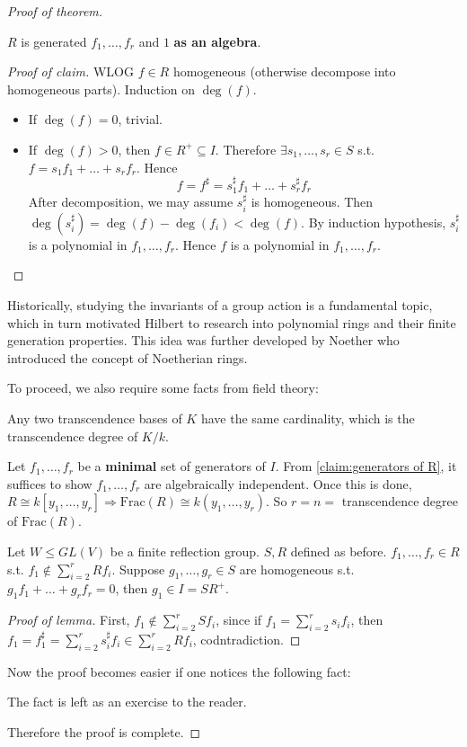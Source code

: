 \documentclass[12pt]{extarticle}
\begin{document}
\begin{proof}[Proof of theorem]
        \begin{claim}\label{claim:generators of R}
                $R$ is generated $f_1, \dots, f_r$ and $1$ \textbf{as an algebra}.
        \end{claim}
        \begin{proof}[Proof of claim]
            WLOG $f\in R$ homogeneous (otherwise decompose into homogeneous parts). Induction on $\deg(f)$.
            \begin{itemize}
                \item If $\deg(f) = 0$, trivial.
                \item If $\deg(f) >0$, then $f\in R^+\subseteq I$. Therefore $\exists s_1, \dots, s_r\in S$ s.t. $f = s_1 f_1 + \dots + s_r f_r$. Hence
                    $$f = f^\sharp = s_1^\sharp f_1 + \dots + s_r^\sharp f_r$$
                    After decomposition, we may assume $s_i^\sharp$ is homogeneous. Then $\deg(s_i^\sharp) = \deg(f) - \deg(f_i) < \deg(f)$. By induction hypothesis, $s_i^\sharp$ is a polynomial in $f_1, \dots, f_r$. Hence $f$ is a polynomial in $f_1, \dots, f_r$.
            \end{itemize}
        \end{proof}
        \begin{hisnote}
            Historically, studying the invariants of a group action is a fundamental topic, which in turn motivated Hilbert to research into polynomial rings and their finite generation properties. This idea was further developed by Noether who introduced the concept of Noetherian rings.
        \end{hisnote}
        To proceed, we also require some facts from field theory:
        \begin{theorem}
            Any two transcendence bases of $K$ have the same cardinality, which is the transcendence degree of $K/k$.
        \end{theorem}
        Let $f_1, \dots, f_r$ be a \textbf{minimal} set of generators of $I$. From \cref{claim:generators of R}, it suffices to show $f_1, \dots, f_r$ are algebraically independent. Once this is done, $R\cong k[y_1, \dots, y_r]\Rightarrow \mathrm{Frac}(R)\cong k(y_1, \dots, y_r)$. So $r = n =$ transcendence degree of $\mathrm{Frac}(R)$.
        \begin{lemma}
            Let $W\le GL(V)$ be a finite reflection group. $S, R$ defined as before. $f_1, \dots, f_r\in R$ s.t. $f_1\notin \sum_{i=2}^{r} Rf_i$. Suppose $g_1, \dots, g_r\in S$ are homogeneous s.t. $g_1 f_1 + \dots + g_r f_r = 0$, then $g_1\in I = SR^+$.
        \end{lemma}
        \begin{proof}[Proof of lemma]
            First, $f_1\notin \sum_{i=2}^{r} Sf_i$, since if $f_1 = \sum_{i=2}^{r} s_i f_i$, then $f_1 = f_1^\sharp = \sum_{i=2}^{r} s_i^\sharp f_i\in \sum_{i=2}^{r} Rf_i$, codntradiction.
        \end{proof}
        Now the proof becomes easier if one notices the following fact:
        \begin{fact}
            The fact is left as an exercise to the reader.
        \end{fact}
        \noindent Therefore the proof is complete.


\end{proof}
\end{document}

